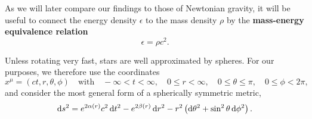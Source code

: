 As we will later compare our findings to those of Newtonian gravity, it will be useful to connect the energy density $\epsilon$ to the mass density $\rho$ by the \textbf{mass-energy equivalence relation}
\begin{equation}
	\epsilon = \rho c^2 .
	\label{eq:tov:mass_energy_equivalence}
\end{equation}

Unless rotating very fast, stars are well approximated by spheres.
For our purposes, we therefore use the coordinates
\begin{equation}
	x^\mu = (c t, r, \theta, \phi)
	\quad \text{with} \quad
	-\infty < t < \infty, \quad
	0 \leq r < \infty, \quad
	0 \leq \theta \leq \pi, \quad
	0 \leq \phi < 2 \pi ,
\end{equation}
and consider the most general form of a spherically symmetric metric, \cite[equation 5.11]{ref:carroll}
\begin{equation}
	\mathop{}\!\mathrm{d} s^2 = e^{2 \alpha(r)} c^2 \mathop{}\!\mathrm{d} t^2 - e^{2 \beta(r)} \mathop{}\!\mathrm{d} r^2 - r^2 \left( \mathop{}\!\mathrm{d} \theta^2 + \sin^2 \theta \mathop{}\!\mathrm{d} \phi^2 \right) .
\label{eq:tov:metric}
\end{equation}

